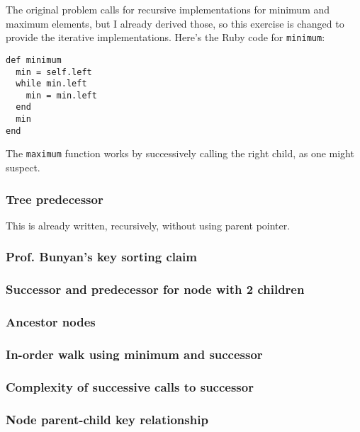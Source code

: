 \documentclass{article}
\begin{document}
The original problem calls for recursive implementations for minimum
and maximum elements, but I already derived those, so this exercise
is changed to provide the iterative implementations. Here's the
Ruby code for \texttt{minimum}:

\begin{lstlisting}[frame=single]
def minimum
  min = self.left
  while min.left
    min = min.left
  end
  min
end
\end{lstlisting}

The \texttt{maximum} function works by successively calling the right
child, as one might suspect.

\subsubsection{Tree predecessor}

This is already written, recursively, without using parent pointer.


\subsubsection{Prof. Bunyan's key sorting claim}

\subsubsection{Successor and predecessor for node with 2 children}

\subsubsection{Ancestor nodes}

\subsubsection{In-order walk using minimum and successor}

\subsubsection{Complexity of successive calls to successor}

\subsubsection{Node parent-child key relationship}

\end{document}

